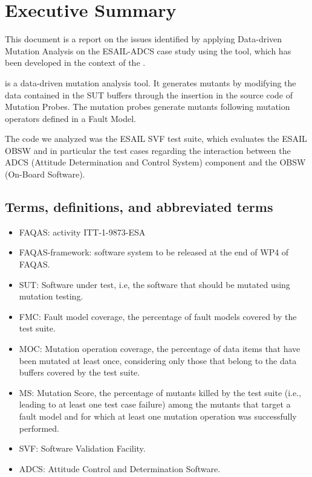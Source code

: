 
\chapter{Executive Summary}

This document is a report on the issues identified by applying Data-driven Mutation Analysis on the ESAIL-ADCS case study using the \DAMA tool, which has been developed in the context of the \FAQAS.

\DAMA is a data-driven mutation analysis tool. It generates mutants by modifying the data contained in the SUT buffers through the insertion in the source code of Mutation Probes. The mutation probes generate mutants following mutation operators defined in a Fault Model.

The code we analyzed was the ESAIL SVF test suite, which evaluates the ESAIL OBSW and in particular the test cases regarding the interaction between the ADCS (Attitude Determination and Control System) component and the OBSW (On-Board Software).


\section{Terms, definitions, and abbreviated terms}

\begin{itemize}
\item{FAQAS}: activity ITT-1-9873-ESA
\item{FAQAS-framework}: software system to be released at the end of WP4 of FAQAS.
\item{SUT}: Software under test, i.e, the software that should be mutated using mutation testing.
\item{FMC}: Fault model coverage, the percentage of fault models covered by the test suite.
\item{MOC}: Mutation operation coverage, the percentage of data items that have been mutated at least once, considering only those that belong to the data buffers covered by the test suite.
\item{MS}: Mutation Score, the percentage of mutants killed by the test suite (i.e., leading to at least one test case failure) among the mutants that target a fault model and for which at least one mutation operation was successfully performed.
\item{SVF}: Software Validation Facility.
\item{ADCS}: Attitude Control and Determination Software.

\end{itemize}

\clearpage

